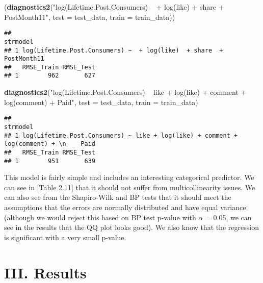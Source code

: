 \documentclass[
]{article}
\newenvironment{Shaded}{\begin{snugshade}}{\end{snugshade}}
\newcommand{\DataTypeTok}[1]{\textcolor[rgb]{0.13,0.29,0.53}{#1}}
\newcommand{\KeywordTok}[1]{\textcolor[rgb]{0.13,0.29,0.53}{\textbf{#1}}}
\newcommand{\NormalTok}[1]{#1}
\newcommand{\StringTok}[1]{\textcolor[rgb]{0.31,0.60,0.02}{#1}}
\begin{document}
\begin{Shaded}
\begin{Highlighting}[]
\NormalTok{(}\KeywordTok{diagnostics2}\NormalTok{(}\StringTok{"log(Lifetime.Post.Consumers) ~  + log(like)  + share  + PostMonth11"}\NormalTok{, }\DataTypeTok{test =}\NormalTok{ test_data, }\DataTypeTok{train =}\NormalTok{ train_data))}
\end{Highlighting}
\end{Shaded}

\begin{verbatim}
##                                                              strmodel
## 1 log(Lifetime.Post.Consumers) ~  + log(like)  + share  + PostMonth11
##   RMSE_Train RMSE_Test
## 1        962       627
\end{verbatim}

\begin{Shaded}
\begin{Highlighting}[]
\KeywordTok{diagnostics2}\NormalTok{(}\StringTok{"log(Lifetime.Post.Consumers) ~ like + log(like) + comment + log(comment) + }
\StringTok{    Paid"}\NormalTok{, }\DataTypeTok{test =}\NormalTok{ test_data, }\DataTypeTok{train =}\NormalTok{ train_data)}
\end{Highlighting}
\end{Shaded}

\begin{verbatim}
##                                                                                strmodel
## 1 log(Lifetime.Post.Consumers) ~ like + log(like) + comment + log(comment) + \n    Paid
##   RMSE_Train RMSE_Test
## 1        951       639
\end{verbatim}

This model is fairly simple and includes an interesting categorical
predictor. We can see in {[}Table 2.11{]} that it should not suffer from
multicollinearity issues. We can also see from the Shapiro-Wilk and BP
tests that it should meet the assumptions that the errors are normally
distributed and have equal variance (although we would reject this based
on BP test p-value with \(\alpha\) = 0.05, we can see in the results
that the QQ plot looks good). We also know that the regression is
significant with a very small p-value.

\hypertarget{iii.-results}{%
\section{\texorpdfstring{\textbf{III}.
Results}{III. Results}}\label{iii.-results}}
\end{document}
